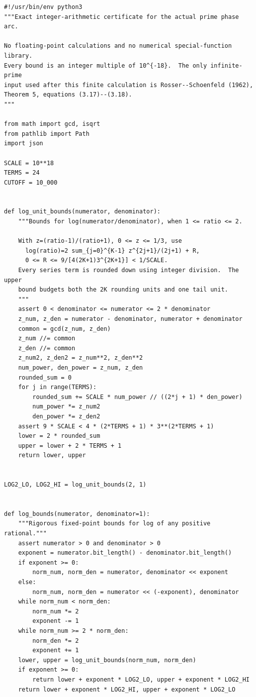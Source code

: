 \documentclass[11pt,a4paper]{article}
\theoremstyle{definition}\newtheorem{definition}[theorem]{Definition}
\theoremstyle{remark}\newtheorem{remark}[theorem]{Remark}
\numberwithin{equation}{section}
\begin{document}
\begin{lstlisting}
#!/usr/bin/env python3
"""Exact integer-arithmetic certificate for the actual prime phase arc.

No floating-point calculations and no numerical special-function library.
Every bound is an integer multiple of 10^{-18}.  The only infinite-prime
input used after this finite calculation is Rosser--Schoenfeld (1962),
Theorem 5, equations (3.17)--(3.18).
"""

from math import gcd, isqrt
from pathlib import Path
import json

SCALE = 10**18
TERMS = 24
CUTOFF = 10_000


def log_unit_bounds(numerator, denominator):
    """Bounds for log(numerator/denominator), when 1 <= ratio <= 2.

    With z=(ratio-1)/(ratio+1), 0 <= z <= 1/3, use
      log(ratio)=2 sum_{j=0}^{K-1} z^{2j+1}/(2j+1) + R,
      0 <= R <= 9/[4(2K+1)3^{2K+1}] < 1/SCALE.
    Every series term is rounded down using integer division.  The upper
    bound budgets both the 2K rounding units and one tail unit.
    """
    assert 0 < denominator <= numerator <= 2 * denominator
    z_num, z_den = numerator - denominator, numerator + denominator
    common = gcd(z_num, z_den)
    z_num //= common
    z_den //= common
    z_num2, z_den2 = z_num**2, z_den**2
    num_power, den_power = z_num, z_den
    rounded_sum = 0
    for j in range(TERMS):
        rounded_sum += SCALE * num_power // ((2*j + 1) * den_power)
        num_power *= z_num2
        den_power *= z_den2
    assert 9 * SCALE < 4 * (2*TERMS + 1) * 3**(2*TERMS + 1)
    lower = 2 * rounded_sum
    upper = lower + 2 * TERMS + 1
    return lower, upper


LOG2_LO, LOG2_HI = log_unit_bounds(2, 1)


def log_bounds(numerator, denominator=1):
    """Rigorous fixed-point bounds for log of any positive rational."""
    assert numerator > 0 and denominator > 0
    exponent = numerator.bit_length() - denominator.bit_length()
    if exponent >= 0:
        norm_num, norm_den = numerator, denominator << exponent
    else:
        norm_num, norm_den = numerator << (-exponent), denominator
    while norm_num < norm_den:
        norm_num *= 2
        exponent -= 1
    while norm_num >= 2 * norm_den:
        norm_den *= 2
        exponent += 1
    lower, upper = log_unit_bounds(norm_num, norm_den)
    if exponent >= 0:
        return lower + exponent * LOG2_LO, upper + exponent * LOG2_HI
    return lower + exponent * LOG2_HI, upper + exponent * LOG2_LO



\end{lstlisting}
\end{document}
